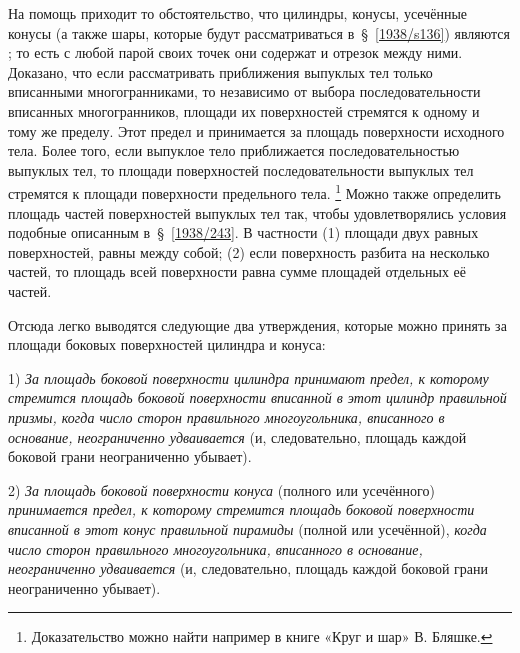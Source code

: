 На помощь приходит то обстоятельство, что цилиндры, конусы, усечённые конусы (а также шары, которые будут рассматриваться в~§~\ref{1938/s136}) являются ; то есть с любой парой своих точек они содержат и отрезок между ними.
Доказано, что если рассматривать приближения выпуклых тел только  вписанными многогранниками, то независимо от выбора последовательности вписанных многогранников, площади их поверхностей стремятся к одному и тому же пределу.
Этот предел и принимается за площадь поверхности исходного тела. 
Более того, если выпуклое тело приближается последовательностью выпуклых тел,
то площади поверхностей последовательности выпуклых тел стремятся к площади поверхности предельного тела.%
\footnote{Доказательство можно найти например в книге «Круг и шар» В. Бляшке.}
Можно также определить площадь частей поверхностей выпуклых тел так, чтобы удовлетворялись условия подобные описанным в~§~\ref{1938/243}.
В частности (1) площади двух равных поверхностей, равны между собой; (2) если поверхность разбита на несколько частей, то  площадь всей поверхности равна сумме площадей отдельных её частей.

Отсюда легко выводятся следующие два утверждения, которые можно принять за  площади боковых поверхностей цилиндра и конуса:

1) \emph{За площадь боковой поверхности цилиндра принимают предел, к которому стремится площадь боковой поверхности вписанной в этот цилиндр правильной призмы, когда число сторон правильного многоугольника, вписанного в основание, неограниченно удваивается} (и, следовательно, площадь каждой боковой грани неограниченно убывает).

2) \emph{За площадь боковой поверхности конуса} (полного или усечённого) \emph{принимается предел, к которому стремится площадь боковой поверхности вписанной в этот конус правильной пирамиды} (полной или усечённой), \emph{когда число сторон правильного многоугольника, вписанного в основание, неограниченно удваивается} (и, следовательно, площадь каждой боковой грани неограниченно убывает).

